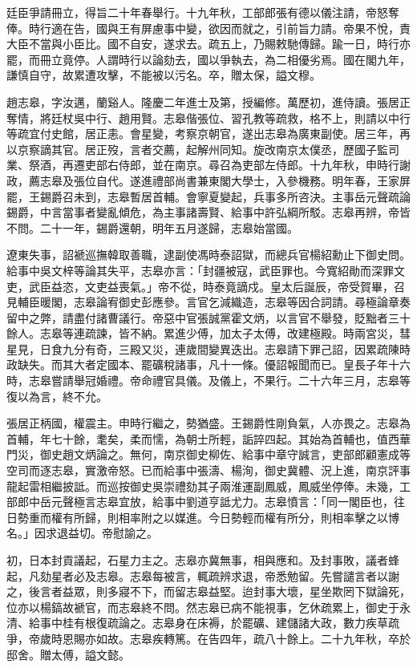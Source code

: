 \begin{pinyinscope}
廷臣爭請冊立，得旨二十年春舉行。十九年秋，工部郎張有德以儀注請，帝怒奪俸。時行適在告，國與王有屏慮事中變，欲因而就之，引前旨力請。帝果不悅，責大臣不當與小臣比。國不自安，遂求去。疏五上，乃賜敕馳傳歸。踰一日，時行亦罷，而冊立竟停。人謂時行以論劾去，國以爭執去，為二相優劣焉。國在閣九年，謙慎自守，故累遭攻擊，不能被以污名。卒，贈太保，謚文穆。

趙志皋，字汝邁，蘭谿人。隆慶二年進士及第，授編修。萬歷初，進侍讀。張居正奪情，將廷杖吳中行、趙用賢。志皋偕張位、習孔教等疏救，格不上，則請以中行等疏宜付史館，居正恚。會星變，考察京朝官，遂出志皋為廣東副使。居三年，再以京察謫其官。居正歿，言者交薦，起解州同知。旋改南京太僕丞，歷國子監司業、祭酒，再遷吏部右侍郎，並在南京。尋召為吏部左侍郎。十九年秋，申時行謝政，薦志皋及張位自代。遂進禮部尚書兼東閣大學士，入參機務。明年春，王家屏罷，王錫爵召未到，志皋暫居首輔。會寧夏變起，兵事多所咨決。主事岳元聲疏論錫爵，中言當事者變亂傾危，為主事諸壽賢、給事中許弘綱所駁。志皋再辨，帝皆不問。二十一年，錫爵還朝，明年五月遂歸，志皋始當國。

遼東失事，詔褫巡撫韓取善職，逮副使馮時泰詔獄，而總兵官楊紹勳止下御史問。給事中吳文梓等論其失平，志皋亦言：「封疆被寇，武臣罪也。今寬紹勛而深罪文吏，武臣益恣，文吏益喪氣。」帝不從，時泰竟謫戍。皇太后誕辰，帝受賀畢，召見輔臣暖閣，志皋論宥御史彭應參。言官乞減織造，志皋等因合詞請。尋極論章奏留中之弊，請盡付諸曹議行。帝惡中官張誠黨霍文炳，以言官不舉發，貶黜者三十餘人。志皋等連疏諫，皆不納。累進少傅，加太子太傅，改建極殿。時兩宮災，彗星見，日食九分有奇，三殿又災，連歲間變異迭出。志皋請下罪己詔，因累疏陳時政缺失。而其大者定國本、罷礦稅諸事，凡十一條。優詔報聞而已。皇長子年十六時，志皋嘗請舉冠婚禮。帝命禮官具儀。及儀上，不果行。二十六年三月，志皋等復以為言，終不允。

張居正柄國，權震主。申時行繼之，勢猶盛。王錫爵性剛負氣，人亦畏之。志皋為首輔，年七十餘，耄矣，柔而懦，為朝士所輕，詬誶四起。其始為首輔也，值西華門災，御史趙文炳論之。無何，南京御史柳佐、給事中章守誠言，吏部郎顧憲成等空司而逐志皋，實激帝怒。已而給事中張濤、楊洵，御史冀體、況上進，南京評事龍起雷相繼披詆。而巡按御史吳崇禮劾其子兩淮運副鳳威，鳳威坐停俸。未幾，工部郎中岳元聲極言志皋宜放，給事中劉道亨詆尤力。志皋憤言：「同一閣臣也，往日勢重而權有所歸，則相率附之以媒進。今日勢輕而權有所分，則相率擊之以博名。」因求退益切。帝慰諭之。

初，日本封貢議起，石星力主之。志皋亦冀無事，相與應和。及封事敗，議者蜂起，凡劾星者必及志皋。志皋每被言，輒疏辨求退，帝悉勉留。先嘗譴言者以謝之，後言者益眾，則多寢不下，而留志皋益堅。迨封事大壞，星坐欺罔下獄論死，位亦以楊鎬故褫官，而志皋終不問。然志皋已病不能視事，乞休疏累上，御史于永清、給事中桂有根復疏論之。志皋身在床褥，於罷礦、建儲諸大政，數力疾草疏爭，帝歲時恩賜亦如故。志皋疾轉篤。在告四年，疏八十餘上。二十九年秋，卒於邸舍。贈太傅，謚文懿。


\end{pinyinscope}
